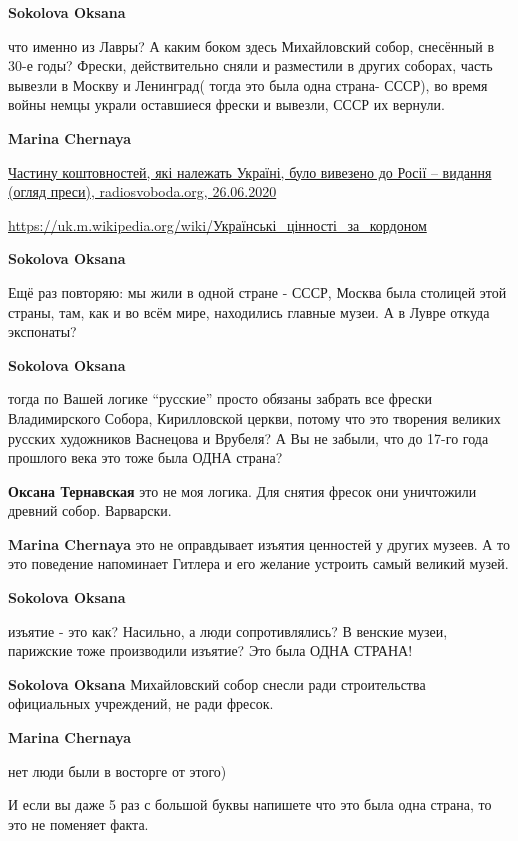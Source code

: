 \begin{itemize}
\begin{itemize}
\begin{itemize}
\textbf{Sokolova Oksana} 

что именно из Лавры? А каким боком здесь Михайловский собор, снесённый в 30-е
годы? Фрески, действительно сняли и разместили в других соборах, часть вывезли
в Москву и Ленинград( тогда это была одна страна- СССР), во время войны немцы
украли оставшиеся фрески и вывезли, СССР их вернули.

\textbf{Marina Chernaya} 

\href{www.radiosvoboda.org/amp/30690956.html}{%
Частину коштовностей, які належать Україні, було вивезено до Росії – видання (огляд преси), %
radiosvoboda.org, 26.06.2020%
}

\url{https://uk.m.wikipedia.org/wiki/Українські_цінності_за_кордоном}

\textbf{Sokolova Oksana} 

Ещё раз повторяю: мы жили в одной стране - СССР, Москва была столицей этой
страны, там, как и во всём мире, находились главные музеи. А в Лувре откуда
экспонаты?

\textbf{Sokolova Oksana} 

тогда по Вашей логике \enquote{русские} просто обязаны забрать все фрески Владимирского
Собора, Кирилловской церкви, потому что это творения великих русских художников
Васнецова и Врубеля? А Вы не забыли, что до 17-го года прошлого века это тоже
была ОДНА страна?

\textbf{Оксана Тернавская} это не моя логика. Для снятия фресок они уничтожили древний собор. Варварски.

\textbf{Marina Chernaya} это не оправдывает изъятия ценностей у других музеев.
А то это поведение напоминает Гитлера и его желание устроить самый великий музей.

\textbf{Sokolova Oksana} 

изъятие - это как? Насильно, а люди сопротивлялись? В
венские музеи, парижские тоже производили изъятие? Это была ОДНА СТРАНА!


\textbf{Sokolova Oksana} Михайловский собор снесли ради строительства официальных учреждений, не ради фресок.

\textbf{Marina Chernaya} 

нет люди были в восторге от этого)

И если вы даже 5 раз с большой буквы напишете что это была одна страна, то это
не поменяет факта.


\end{itemize}
\end{itemize}
\end{itemize}

